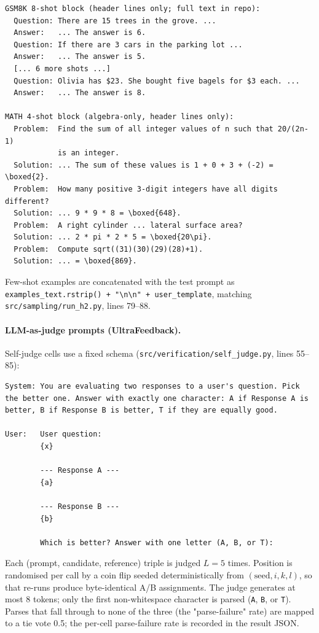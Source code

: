 \begin{lstlisting}[basicstyle=\ttfamily\footnotesize,breaklines=true,frame=single]
GSM8K 8-shot block (header lines only; full text in repo):
  Question: There are 15 trees in the grove. ...
  Answer:   ... The answer is 6.
  Question: If there are 3 cars in the parking lot ...
  Answer:   ... The answer is 5.
  [... 6 more shots ...]
  Question: Olivia has $23. She bought five bagels for $3 each. ...
  Answer:   ... The answer is 8.

MATH 4-shot block (algebra-only, header lines only):
  Problem:  Find the sum of all integer values of n such that 20/(2n-1)
            is an integer.
  Solution: ... The sum of these values is 1 + 0 + 3 + (-2) = \boxed{2}.
  Problem:  How many positive 3-digit integers have all digits different?
  Solution: ... 9 * 9 * 8 = \boxed{648}.
  Problem:  A right cylinder ... lateral surface area?
  Solution: ... 2 * pi * 2 * 5 = \boxed{20\pi}.
  Problem:  Compute sqrt((31)(30)(29)(28)+1).
  Solution: ... = \boxed{869}.
\end{lstlisting}

Few-shot examples are concatenated with the test prompt as
\texttt{examples\_text.rstrip() + "\textbackslash n\textbackslash n" + user\_template},
matching \texttt{src/sampling/run\_h2.py}, lines 79--88.

\paragraph{LLM-as-judge prompts (UltraFeedback).}
Self-judge cells use a fixed schema
(\texttt{src/verification/self\_judge.py}, lines 55--85):

\begin{lstlisting}[basicstyle=\ttfamily\footnotesize,breaklines=true,frame=single]
System: You are evaluating two responses to a user's question. Pick
the better one. Answer with exactly one character: A if Response A is
better, B if Response B is better, T if they are equally good.

User:   User question:
        {x}

        --- Response A ---
        {a}

        --- Response B ---
        {b}

        Which is better? Answer with one letter (A, B, or T):
\end{lstlisting}

Each (prompt, candidate, reference) triple is judged $L{=}5$ times.
Position is randomised per call by a coin flip seeded deterministically
from $(\text{seed}, i, k, l)$, so that re-runs produce byte-identical
A/B assignments. The judge generates at most 8 tokens; only the first
non-whitespace character is parsed (\texttt{A}, \texttt{B}, or
\texttt{T}). Parses that fall through to none of the three (the
"parse-failure" rate) are mapped to a tie vote 0.5; the per-cell
parse-failure rate is recorded in the result JSON.

